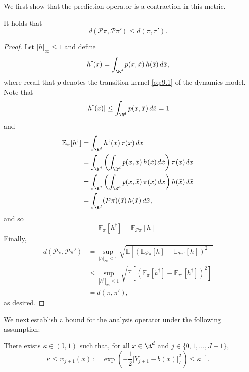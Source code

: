 We first show that the prediction operator is a contraction in this metric.

\begin{lemma}
  \label{lem:9.5}
  It holds that
  \[
    d(\mathcal{P}\pi, \mathcal{P}\pi') \leq d(\pi, \pi').
  \]
\end{lemma}

\begin{proof}
  Let $|h|_\infty \leq 1$ and define
  \[
    h^\dagger(x) = \int_{\R^d} p(x, \tilde{x})\,h(\tilde{x})\,d\tilde{x},
  \]
  where recall that $p$ denotes the transition kernel \eqref{eq:9.1} of the dynamics
  model. Note that
  \[
    |h^\dagger(x)| \leq \int_{\R^d} p(x, \tilde{x})\,d\tilde{x} = 1
  \]
  and
  \begin{align*}
    \mathbb{E}_\pi[h^\dagger]
    &= \int_{\R^d} h^\dagger(x)\,\pi(x)\,dx \\
    &= \int_{\R^d} \left(\int_{\R^d} p(x, \tilde{x})\,h(\tilde{x})\,d\tilde{x}\right)\pi(x)\,dx \\
    &= \int_{\R^d} \left(\int_{\R^d} p(x, \tilde{x})\,\pi(x)\,dx\right)h(\tilde{x})\,d\tilde{x} \\
    &= \int_{\R^d} (\mathcal{P}\pi)(\tilde{x})\,h(\tilde{x})\,d\tilde{x},
  \end{align*}
  and so
  \[
    \mathbb{E}_\pi[h^\dagger] = \mathbb{E}_{\mathcal{P}\pi}[h].
  \]
  Finally,
  \begin{align*}
    d(\mathcal{P}\pi, \mathcal{P}\pi')
    &= \sup_{|h|_\infty \leq 1}
       \sqrt{\mathbb{E}\!\left[\left(\mathbb{E}_{\mathcal{P}\pi}[h]
         - \mathbb{E}_{\mathcal{P}\pi'}[h]\right)^2\right]} \\
    &\leq \sup_{|h^\dagger|_\infty \leq 1}
       \sqrt{\mathbb{E}\!\left[\left(\mathbb{E}_\pi[h^\dagger]
         - \mathbb{E}_{\pi'}[h^\dagger]\right)^2\right]} \\
    &= d(\pi, \pi'),
  \end{align*}
  as desired.
\end{proof}

We next establish a bound for the analysis operator under the following assumption:

\begin{assumption}
  \label{ass:9.6}
  There exists $\kappa \in (0, 1)$ such that, for all $x \in \R^d$ and
  $j \in \{0, 1, \ldots, J-1\}$,
  \[
    \kappa \leq w_{j+1}(x) := \exp\!\left(
      -\frac{1}{2}\bigl|Y_{j+1} - b(x)\bigr|_\Gamma^2
    \right) \leq \kappa^{-1}.
  \]
\end{assumption}

